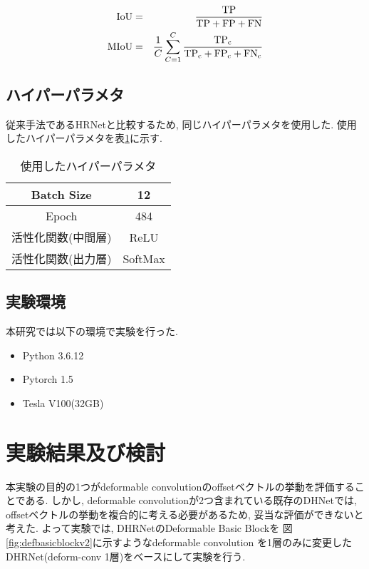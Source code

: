 \begin{eqnarray}
  \rm{IoU} &=& \frac{\rm{TP}}{\rm{TP} + \rm{FP} + \rm{FN}}\label{eq:iou}\\
  \rm{MIoU} &=& \frac{1}{C} \sum_{C=1}^C \frac{\rm{TP}_c}{\rm{TP}_c + \rm{FP}_c + \rm{FN}_c}\label{eq:miou}
\end{eqnarray}

\subsection{ハイパーパラメタ}\label{sub:hypara}
従来手法であるHRNet\cite{hrnet}と比較するため, 同じハイパーパラメタを使用した. 使用したハイパーパラメタを表\ref{tab:hypara}に示す. 
\begin{table}[H]
  \centering
  \caption{使用したハイパーパラメタ}
  \begin{tabular}{c|c} \hline \hline
     Batch Size & 12 \\ \hline 
     Epoch & 484  \\ \hline
     活性化関数(中間層) & ReLU \\ \hline
     活性化関数(出力層) & SoftMax\\ \hline \hline
  \end{tabular}
  \label{tab:hypara}
\end{table}

\subsection{実験環境}
本研究では以下の環境で実験を行った.
\begin{itemize}
\item Python 3.6.12
\item Pytorch 1.5
\item Tesla V100(32GB)
\end{itemize}


\section{実験結果及び検討}
本実験の目的の1つがdeformable convolutionのoffsetベクトルの挙動を評価することである. しかし, deformable convolutionが2つ含まれている既存のDHNetでは, offsetベクトルの挙動を複合的に考える必要があるため, 妥当な評価ができないと考えた.
よって実験では, DHRNetのDeformable Basic Blockを 図\ref{fig:defbasicblockv2}に示すようなdeformable convolution を1層のみに変更したDHRNet(deform-conv 1層)をベースにして実験を行う.

